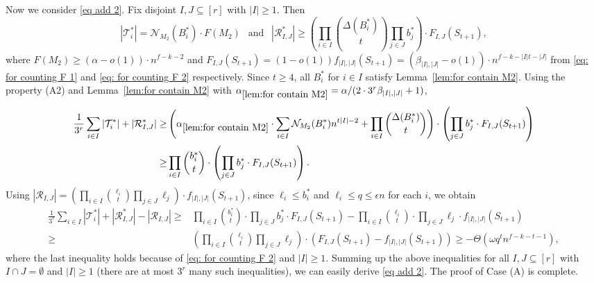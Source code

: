\documentclass[10pt]{article}
\begin{document}
Now we consider \eqref{eq add 2}.
Fix disjoint $I,J\subseteq[r]$ with $|I|\geq 1$.
Then $$|\mathcal{T}^\ast_{i}|=\mathcal{N}_{M_2}(B^\ast_{i})\cdot F(M_2) ~~\mbox{ and } ~~ |\mathcal{R}^\ast_{I,J}|\geq \left(\prod_{i\in I}{\Delta (B^\ast_{i}) \choose t} \prod_{j\in J}b^\ast_j\right) \cdot F_{I,J}(S_{t+1}),$$
where $F(M_2)\geq (\alpha-o(1))\cdot n^{f-k-2}$ and $F_{I,J}(S_{t+1})=(1-o(1))f_{|I|,|J|}(S_{t+1})=(\beta_{|I|,|J|}-o(1))\cdot n^{f-k-|I|t-|J|}$ from \eqref{eq: for counting F 1} and \eqref{eq: for counting F 2} respectively.
Since $t\geq 4$, all $B_i^*$ for $i\in I$ satisfy Lemma~\ref{lem:for contain M2}.
Using the property (A2) and Lemma~\ref{lem:for contain M2} with $\alpha_{\ref{lem:for contain M2}}=\alpha/(2\cdot 3^{r}\beta_{|I|,|J|}+1)$,
\begin{align*}
\frac{1}{3^{r}}\sum_{i\in I}|\mathcal{T}^\ast_{i}|+|\mathcal{R}^\ast_{I,J}|
\geq &\left(\alpha_{\ref{lem:for contain M2}}\cdot \sum_{i\in I}\mathcal{N}_{M_2}(B^\ast_{i}) n^{t|I|-2}+ \prod_{i\in I}{\Delta(B^\ast_{i})\choose t}\right)\cdot \left(\prod_{j\in J}b^\ast_j\cdot F_{I,J}(S_{t+1})\right)\\
\geq &\prod_{i\in I}{b^\ast_{i} \choose t}\cdot \left(\prod_{j\in J}b^\ast_j \cdot F_{I,J}(S_{t+1})\right).
\end{align*}
Using $|\mathcal{R}_{I,J}|=\left(\prod_{i\in I}{\ell_{i} \choose t}\prod_{j\in J}\ell_j\right) \cdot f_{|I|,|J|}(S_{t+1})$,
since $\ell_i\leq b_i^\ast$ and $\ell_i\leq q\leq \epsilon n$ for each $i$, we obtain
\begin{align}\label{equ:1/3r}
\frac{1}{3^{r}}\sum_{i\in I}|\mathcal{T}^\ast_{i}|+  |\mathcal{R}^\ast_{I,J}|-|\mathcal{R}_{I,J}|
\geq &\prod_{i\in I}{b^\ast_{i} \choose t}\cdot \prod_{j\in J}b^\ast_j \cdot F_{I,J}(S_{t+1})-\prod_{i\in I}{\ell_{i} \choose t}\cdot\prod_{j\in J}\ell_j \cdot f_{|I|,|J|}(S_{t+1})\nonumber
\\\nonumber
\geq &\left(\prod_{i\in I}{\ell_{i} \choose t}\prod_{j\in J}\ell_j\right) \cdot (F_{I,J}(S_{t+1})-f_{|I|,|J|}(S_{t+1}))
\geq -\Theta(\omega q^t n^{f-k-t-1}),
\end{align}
where the last inequality holds because of \eqref{eq: for counting F 2} and $|I|\geq 1$.
Summing up the above inequalities for all $I,J\subseteq [r]$ with $I\cap J=\emptyset$ and $|I|\geq 1$ (there are at most $3^r$ many such inequalities), we can easily derive \eqref{eq add 2}.
The proof of Case (A) is complete.





\medskip
\end{document}
